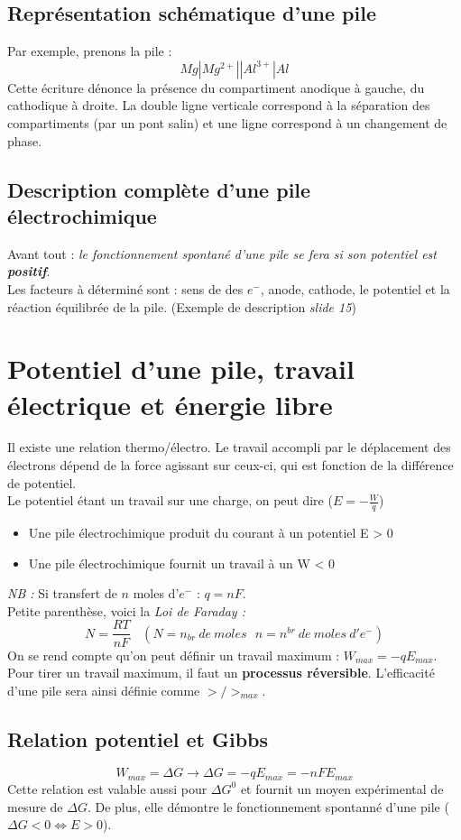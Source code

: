 \documentclass[british,french,11pt, a4paper, openany]{book}
\begin{document}
\subsection{Représentation schématique d'une pile}
Par exemple, prenons la pile :
$$Mg | Mg^{2+} || Al^{3+} | Al$$
Cette écriture dénonce la présence du compartiment anodique à gauche, du cathodique à droite. La double ligne verticale correspond à la séparation des compartiments (par un pont salin) et une ligne correspond à un changement de phase.

\subsection{Description complète d'une pile électrochimique}
Avant tout : \textit{le fonctionnement spontané d'une pile se fera si son potentiel est \textbf{positif}}.\\
Les facteurs à déterminé sont : sens de des $e^-$, anode, cathode, le potentiel et la réaction équilibrée de la pile. (Exemple de description \textit{slide 15})

\section{Potentiel d'une pile, travail électrique et énergie libre}
Il existe une relation thermo/électro. Le travail accompli par le déplacement des électrons dépend de la force agissant sur ceux-ci, qui est fonction de la différence de potentiel.\\
Le potentiel étant un travail sur une charge, on peut dire ($E = -\frac{W}{q}$)
\begin{itemize}
	\item Une pile électrochimique produit du courant à un potentiel E > 0
	\item Une pile électrochimique fournit un travail à un W < 0
\end{itemize}
\textit{NB :} Si transfert de $n$ moles d'$e^-$ : $q = nF$.\\

Petite parenthèse, voici la \textit{Loi de Faraday :}
$$N = \frac{RT}{nF}\ \ \ \ (N = n_{br}\ de\ moles\ \ \ n = n^{br}\ de\ moles\ d'e^-)$$
On se rend compte qu'on peut définir un travail maximum : $W_{max} = -qE_{max}$. Pour tirer un travail maximum, il faut un \textbf{processus réversible}. L'efficacité d'une pile sera ainsi définie comme $>/>_{max}$.
\subsection*{Relation potentiel et Gibbs}
$$W_{max} = \Delta G \rightarrow \Delta G = -qE_{max} = -nFE_{max}$$
Cette relation est valable aussi pour $\Delta G^0$ et fournit un moyen expérimental de mesure de $\Delta G$. De plus, elle démontre le fonctionnement spontanné d'une pile ($\Delta G <0 \Leftrightarrow E > 0$).
\end{document}
